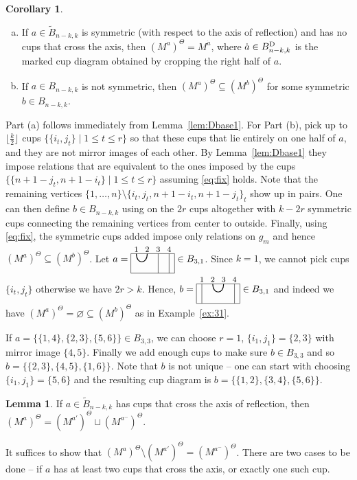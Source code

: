 \documentclass[11pt,reqno]{amsart}
\numberwithin{equation}{section}
\theoremstyle{definition}
\newtheorem{lemma}[theorem]{Lemma}
\newtheorem{cor}[theorem]{Corollary}
\newcommand{\BD}{{B}^\textup{D}}
\newcommand{\da}{\dot{a}}
\newcommand{\tB}{\widetilde{B}}
\newcommand{\cupfa}{\begin{tikzpicture}[baseline={(0,-.3)}, scale = 0.8]
\draw (-.25,0) -- (1.75,0) -- (1.75,-.9) -- (-.25,-.9) -- cycle;
\begin{footnotesize}
\node at (0,.2) {$1$};
\node at (.5,.2) {$2$};
\node at (1,.2) {$3$};
\node at (1.5,.2) {$4$};
\end{footnotesize}
\draw[thick] (0,0) .. controls +(0,-.5) and +(0,-.5) .. +(.5,0);
\draw (1,0) -- (1,-.9);
\draw (1.5,0) -- (1.5,-.9);
\end{tikzpicture}
}
\newcommand{\cupfb}{\begin{tikzpicture}[baseline={(0,-.3)}, scale = 0.8]
\draw (-.25,0) -- (1.75,0) -- (1.75,-.9) -- (-.25,-.9) -- cycle;
\begin{footnotesize}
\node at (0,.2) {$1$};
\node at (.5,.2) {$2$};
\node at (1,.2) {$3$};
\node at (1.5,.2) {$4$};
\end{footnotesize}
\draw[thick] (0.5,0) .. controls +(0,-.5) and +(0,-.5) .. +(.5,0);
\draw (0,0) -- (0,-.9);
\draw (1.5,0) -- (1.5,-.9);
\end{tikzpicture}
}
\begin{document}
\begin{cor}\label{cor:Dbase}
\begin{enumerate}[(a)]
\item
If $a\in \tB_{n-k,k}$ is symmetric (with respect to the axis of reflection) and has no cups that cross the axis, then $(M^a)^\Theta =M^{\da}$, where $\da\in \BD_{n-k,k}$ is the marked cup diagram obtained by cropping the right half of $a$.
\item
If $a \in B_{n-k,k}$ is not symmetric, then $(M^a)^\Theta \subseteq (M^b)^\Theta$ for some symmetric $b \in B_{n-k,k}$.
\end{enumerate}
\end{cor}
\proof
Part (a) follows immediately from Lemma~\ref{lem:Dbase1}.
For Part (b), pick up to $\lfloor\frac{k}{2}\rfloor$ cups $\{\{i_t, j_t\}\mid 1\leq t \leq r\}$ so that these cups that lie entirely on one half of $a$, and they are not mirror images of each other. 
By Lemma~\ref{lem:Dbase1} they impose relations that are equivalent to the ones imposed by the cups $\{\{n+1-j_t, n+1-i_t\}\mid 1\leq t \leq r\}$ assuming \eqref{eq:fix} holds.
Note that the remaining vertices $\{1,\ldots, n\} \setminus \{i_t,j_t, n+1-i_t, n+1-j_t\}_t$ show up in pairs. 
One can then define $b \in B_{n-k,k}$ using on the $2r$ cups altogether with $k-2r$ symmetric cups connecting the remaining vertices from center to outside.
Finally, using \eqref{eq:fix}, the symmetric cups added impose only relations on $g_m$ and hence $(M^a)^\Theta \subseteq (M^b)^\Theta$.
\endproof
\ex
Let $a = \cupfa \in B_{3,1}$.
Since $k = 1$, we cannot pick cups $\{i_t, j_t\}$ otherwise we have $2r > k$.
Hence, $b = \cupfb \in B_{3,1}$ and indeed we have $(M^a)^\Theta = \varnothing \subseteq (M^b)^\Theta$ as in Example~\ref{ex:31}.

If $a = \{\{1,4\}, \{2,3\}, \{5,6\}\} \in B_{3,3}$, we can choose $r=1$, $\{i_1, j_1\} = \{2,3\}$ with mirror image $\{4,5\}$. 
Finally we add enough cups to make sure $b\in B_{3,3}$ and so $b = \{\{2,3\}, \{4,5\}, \{1,6\}\}$.
Note that $b$ is not unique -- one can start with choosing $\{i_1, j_1\} = \{5,6\}$ and the resulting cup diagram is $b=\{\{1,2\},\{3,4\},\{5,6\}\}$.
\endex
\begin{lemma}\label{lem:Dind}
If $a \in \tB_{n-k,k}$ has cups that cross the axis of reflection, then
$(M^a)^\Theta = (M^{a'})^\Theta \sqcup (M^{a^-})^\Theta$. 
\end{lemma}
\proof
It suffices to show that  $(M^{a})^\Theta \setminus (M^{a'})^\Theta = (M^{a^-})^\Theta$.
There are two cases to be done -- if $a$ has at least two cups that cross the axis, or exactly one such cup. 
\end{document}
